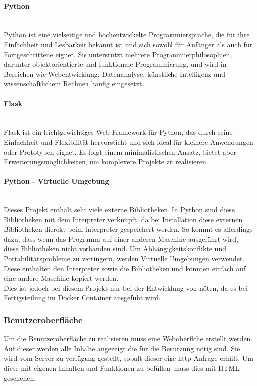 \paragraph{Python}\mbox{}\\
Python ist eine vielseitige und hochentwickelte Programmiersprache, die für ihre Einfachheit und Lesbarkeit bekannt ist und sich sowohl für Anfänger als auch für Fortgeschrittene eignet. Sie unterstützt mehrere Programmierphilosophien, darunter objektorientierte und funktionale Programmierung, und wird in Bereichen wie Webentwicklung, Datenanalyse, künstliche Intelligenz und wissenschaftlichem Rechnen häufig eingesetzt. \cite{chatgpt}

\paragraph{Flask}\mbox{}\\
Flask ist ein leichtgewichtiges Web-Framework für Python, das durch seine Einfachheit und Flexibilität hervorsticht und sich ideal für kleinere Anwendungen oder Prototypen eignet. Es folgt einem minimalistischen Ansatz, bietet aber Erweiterungsmöglichkeiten, um komplexere Projekte zu realisieren. \cite{chatgpt}

\paragraph{Python - Virtuelle Umgebung}\mbox{}\\
Dieses Projekt enthält sehr viele externe Bibliotheken. In Python sind diese Bibliotheken mit dem Interpreter verknüpft, da bei Installation diese externen Bibliotheken dierekt beim Interpreter gespeichert werden. So kommt es allerdings dazu, dass wenn das Programm auf einer anderen Maschine ausgeführt wird, diese Bibliotheken nicht vorhanden sind. Um Abhängigkeitskonflikte und Portabilitätsprobleme zu verringern, werden Virtuelle Umgebungen verwendet. Diese enthalten den Interpreter sowie die Bibliotheken und könnten einfach auf eine andere Maschine kopiert werden.\\
Dies ist jedoch bei diesem Projekt nur bei der Entwicklung von nöten, da es bei Fertigsteilung im Docker Container ausgefüht wird.

\subsubsection{Benutzeroberfläche}

Um die Benutzeroberfläche zu realisieren muss eine Weboberflche erstellt werden. Auf dieser werden alle Inhalte angezeigt die für die Benutzung nötig sind. Sie wird vom Server zu verfügung gestellt, sobalt dieser eine http-Anfrage erhält. Um diese mit eigenen Inhalten und Funktionen zu befüllen, muss dies mit HTML geschehen.

